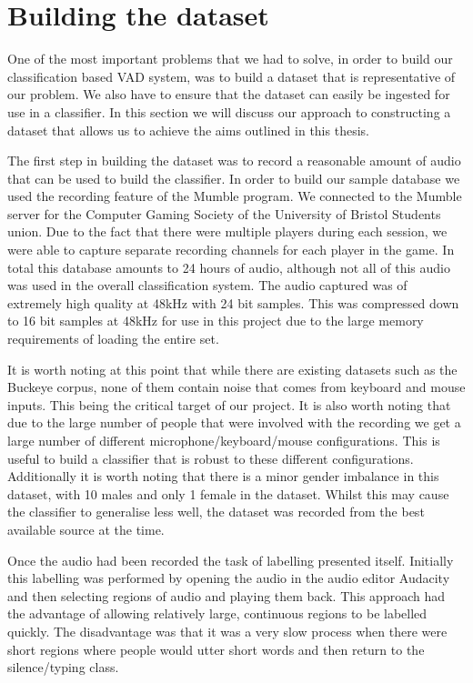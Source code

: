 \documentclass[ %
                    author={Sam Phippen},
                supervisor={Dr. Rafal Bogacz},
                     title={Real time voice activity detectors in noisy personal computing environments},
                  subtitle={},
                    degree={MEng},
                      year={2012} ]{thesis}
\begin{document}
\section{Building the dataset}

One of the most important problems that we had to solve, in order to build our
classification based VAD system, was to build a dataset that is representative
of our problem. We also have to ensure that the dataset can easily be ingested
for use in a classifier. In this section we will discuss our approach to
constructing a dataset that allows us to achieve the aims outlined in this
thesis.

The first step in building the dataset was to record a reasonable amount of
audio that can be used to build the classifier. In order to build our sample
database we used the recording feature of the Mumble\cite{mumble} program. We
connected to the Mumble server for the Computer Gaming Society of the University of
Bristol Students union. Due to the fact that there were multiple players during
each session, we were able to capture separate recording channels for each
player in the game. In total this database amounts to 24 hours of audio,
although not all of this audio was used in the overall classification system.
The audio captured was of extremely high quality at 48kHz with 24 bit samples.
This was compressed down to 16 bit samples at 48kHz for use in this project due
to the large memory requirements of loading the entire set.

It is worth noting at this point that while there are existing datasets such as
the Buckeye corpus\cite{buckeye}, none of them contain noise that comes from
keyboard and mouse inputs. This being the critical target of our project. It is
also worth noting that due to the large number of people that were involved
with the recording we get a large number of different microphone/keyboard/mouse
configurations. This is useful to build a classifier that is robust to these
different configurations. Additionally it is worth noting that there is a minor
gender imbalance in this dataset, with 10 males and only 1 female in the
dataset. Whilst this may cause the classifier to generalise less well, the
dataset was recorded from the best available source at the time.

Once the audio had been recorded the task of labelling presented itself.
Initially this labelling was performed by opening the audio in the audio editor
Audacity\cite{audacity} and then selecting regions of audio and playing them
back. This approach had the advantage of allowing relatively large, continuous
regions to be labelled quickly. The disadvantage was that it was a very slow
process when there were short regions where people would utter short words and
then return to the silence/typing class.
\end{document}
